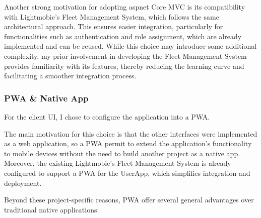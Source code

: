 Another strong motivation for adopting \ac{aspnet} Core \ac{MVC} is its compatibility with Lightmobie's Fleet Management System, which follows the same architectural approach. This ensures easier integration, particularly for functionalities such as authentication and role assignment, which are already implemented and can be reused. While this choice may introduce some additional complexity, my prior involvement in developing the Fleet Management System provides familiarity with its features, thereby reducing the learning curve and facilitating a smoother integration process.
  
\subsubsection{\ac{PWA} \& Native App}
For the client \ac{UI}, I chose to configure the application into a \ac{PWA}.  

The main motivation for this choice is that the other interfaces were implemented as a web application, so a \ac{PWA} permit to extend the application's functionality to mobile devices without the need to build another project as a native app. Moreover, the existing Lightmobie's Fleet Management System is already configured to support a \ac{PWA} for the UserApp, which simplifies integration and deployment.

Beyond these project-specific reasons, \ac{PWA} offer several general advantages over traditional native applications:

